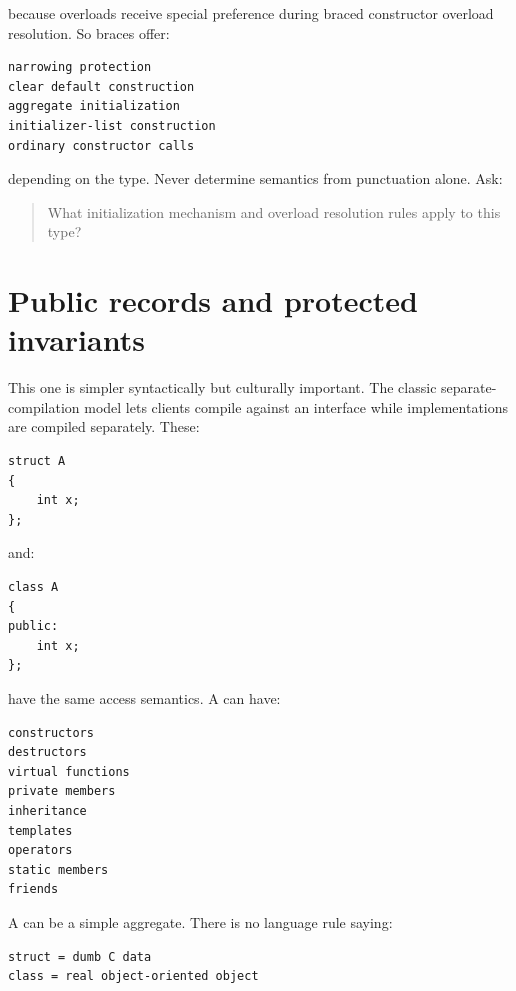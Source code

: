 because  overloads receive special preference during braced constructor overload resolution. So braces offer:

\begin{verbatim}
narrowing protection
clear default construction
aggregate initialization
initializer-list construction
ordinary constructor calls
\end{verbatim}

depending on the type. Never determine semantics from punctuation alone. Ask:

\begin{quote}
What initialization mechanism and overload resolution rules apply to this type?
\end{quote}

\section{Public records and protected invariants}\label{01-foundations-i-ch003-public-records-and-protected-invariants}

\hypertarget{01-foundations-i-ch003-public-records-and-protected-invariants}{}

This one is simpler syntactically but culturally important. The classic separate-compilation model lets clients compile against an interface while implementations are compiled separately. These:

\begin{verbatim}
struct A
{
    int x;
};
\end{verbatim}

and:

\begin{verbatim}
class A
{
public:
    int x;
};
\end{verbatim}

have the same access semantics. A  can have:

\begin{verbatim}
constructors
destructors
virtual functions
private members
inheritance
templates
operators
static members
friends
\end{verbatim}

A  can be a simple aggregate. There is no language rule saying:

\begin{verbatim}
struct = dumb C data
class = real object-oriented object
\end{verbatim}

